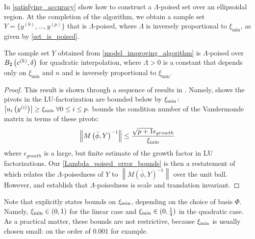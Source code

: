 In \cref{satisfying_accuracy} show how to construct a $\Lambda$-poised set over an ellipsoidal region.
At the completion of the algorithm, we obtain a  sample set $Y=\{y^{(0)}, \ldots, y^{(p)}\}$ that is $\Lambda$-poised, 
where $\Lambda$ is inversely proportional to $\xi_{\min}$, as given by \cref{set_is_poised}.

\begin{theorem}
\label{set_is_poised}
The sample set $Y$ obtained from \cref{model_improving_algorithm} is $\Lambda$-poised over $B_2\left(c^{(k)}, \delta\right)$ for quadratic interpolation, 
where $\Lambda > 0$ is a constant that depends only on $\xi_{\text{min}}$ and $n$ and is inversely proportional to $\xi_{\text{min}}$.
\end{theorem}

\begin{proof}
This result is shown through a sequence of results in \cite{introduction_book}.
Namely,  \cite[Theorem 6.5]{introduction_book} shows the pivots in the LU-factorization are bounded below by $\xi_{\text{min}}$:
$
\left|u_i\left(y^{(i)}\right)\right| \ge \xi_{\text{min}} \; \forall 0 \le i \le p.
$
\cite[Section 6.7, Exercise 3]{introduction_book}
 bounds the condition number of the Vandermonde matrix in terms of these pivots:
\begin{align*}
\left\|M\left(\bar \phi, Y\right)^{-1}\right\| \le \frac{\sqrt{p+1}\epsilon_{growth}}{\xi_{\text{min}}}
\end{align*}
where $\epsilon_{growth}$ is a large, but finite estimate of the growth factor in LU factorizations.
Our \cref{Lambda_poised_error_bounds} is then a restatement of \cite[Theorem 3.14]{introduction_book} which 
relates the $\Lambda$-poisedness of $Y$ to $\left\|M\left(\bar \phi, Y\right)^{-1}\right\|$ over the unit ball.
However, \cite[Lemma 3.8]{introduction_book} and \cite[Lemma 3.9]{introduction_book} establish that $\Lambda$-poisedness is scale and translation invariant.
\end{proof}

Note that \cite[Theorem 6.5]{introduction_book} explicitly states bounds on $\xi_{\text{min}}$, depending on the choice of basis $\Phi$.
Namely, $\xi_{\text{min}} \in (0,1)$ for the linear case and $\xi_{\text{min}} \in (0, \frac 1 4)$ in the quadratic case.
As a practical matter, these bounds are not restrictive, because $\xi_{\text{min}}$ is usually chosen small: on the order of $0.001$ for example.

